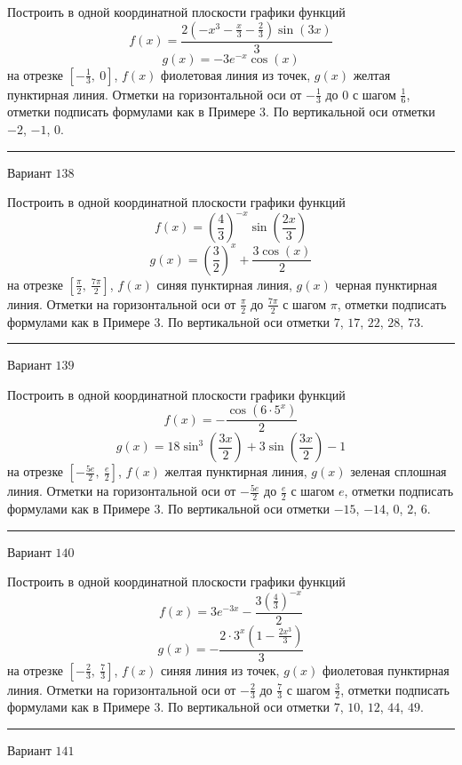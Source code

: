 \documentclass[11pt]{report}
\begin{document}
Построить в одной координатной плоскости графики функций $$f(x) = \frac{2 \left(- x^{3} - \frac{x}{3} - \frac{2}{3}\right) \sin{\left(3 x \right)}}{3}$$ $$g(x) = - 3 e^{- x} \cos{\left(x \right)}$$ на отрезке $\left[- \frac{1}{3}, \  0\right]$, $f(x)$ фиолетовая линия из точек, $g(x)$ желтая пунктирная линия. Отметки на горизонтальной оси от $- \frac{1}{3}$ до $0$ с шагом $\frac{1}{6}$, отметки подписать формулами как в Примере 3. По вертикальной оси отметки $-2$, $-1$, $0$.
\begin{center}
\noindent\rule{8cm}{0.4pt}
\end{center}
Вариант $138$


Построить в одной координатной плоскости графики функций $$f(x) = \left(\frac{4}{3}\right)^{- x} \sin{\left(\frac{2 x}{3} \right)}$$ $$g(x) = \left(\frac{3}{2}\right)^{x} + \frac{3 \cos{\left(x \right)}}{2}$$ на отрезке $\left[\frac{\pi}{2}, \  \frac{7 \pi}{2}\right]$, $f(x)$ синяя пунктирная линия, $g(x)$ черная пунктирная линия. Отметки на горизонтальной оси от $\frac{\pi}{2}$ до $\frac{7 \pi}{2}$ с шагом $\pi$, отметки подписать формулами как в Примере 3. По вертикальной оси отметки $7$, $17$, $22$, $28$, $73$.
\begin{center}
\noindent\rule{8cm}{0.4pt}
\end{center}
Вариант $139$


Построить в одной координатной плоскости графики функций $$f(x) = - \frac{\cos{\left(6 \cdot 5^{x} \right)}}{2}$$ $$g(x) = 18 \sin^{3}{\left(\frac{3 x}{2} \right)} + 3 \sin{\left(\frac{3 x}{2} \right)} - 1$$ на отрезке $\left[- \frac{5 e}{2}, \  \frac{e}{2}\right]$, $f(x)$ желтая пунктирная линия, $g(x)$ зеленая сплошная линия. Отметки на горизонтальной оси от $- \frac{5 e}{2}$ до $\frac{e}{2}$ с шагом $e$, отметки подписать формулами как в Примере 3. По вертикальной оси отметки $-15$, $-14$, $0$, $2$, $6$.
\begin{center}
\noindent\rule{8cm}{0.4pt}
\end{center}
Вариант $140$


Построить в одной координатной плоскости графики функций $$f(x) = 3 e^{- 3 x} - \frac{3 \left(\frac{4}{3}\right)^{- x}}{2}$$ $$g(x) = - \frac{2 \cdot 3^{x} \left(1 - \frac{2 x^{3}}{3}\right)}{3}$$ на отрезке $\left[- \frac{2}{3}, \  \frac{7}{3}\right]$, $f(x)$ синяя линия из точек, $g(x)$ фиолетовая пунктирная линия. Отметки на горизонтальной оси от $- \frac{2}{3}$ до $\frac{7}{3}$ с шагом $\frac{3}{2}$, отметки подписать формулами как в Примере 3. По вертикальной оси отметки $7$, $10$, $12$, $44$, $49$.
\begin{center}
\noindent\rule{8cm}{0.4pt}
\end{center}
Вариант $141$
\end{document}
